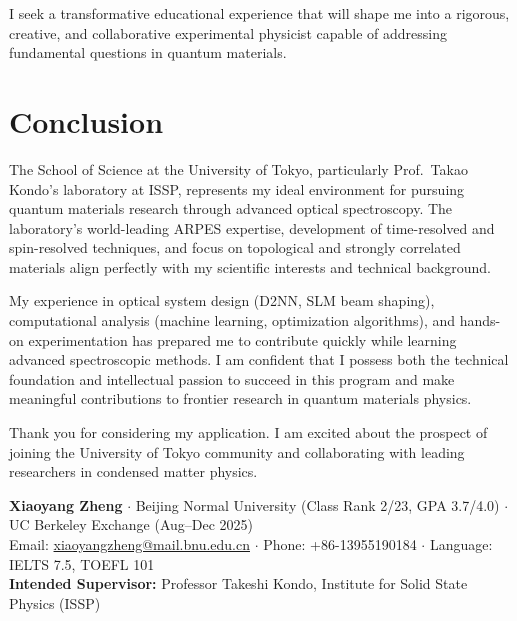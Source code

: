\documentclass[11pt,a4paper]{article}
\begin{document}
I seek a transformative educational experience that will shape me into a rigorous, creative, and collaborative experimental physicist capable of addressing fundamental questions in quantum materials.

\section{Conclusion}

The School of Science at the University of Tokyo, particularly Prof.~Takao Kondo's laboratory at ISSP, represents my ideal environment for pursuing quantum materials research through advanced optical spectroscopy. The laboratory's world-leading ARPES expertise, development of time-resolved and spin-resolved techniques, and focus on topological and strongly correlated materials align perfectly with my scientific interests and technical background.

My experience in optical system design (D2NN, SLM beam shaping), computational analysis (machine learning, optimization algorithms), and hands-on experimentation has prepared me to contribute quickly while learning advanced spectroscopic methods. I am confident that I possess both the technical foundation and intellectual passion to succeed in this program and make meaningful contributions to frontier research in quantum materials physics.

Thank you for considering my application. I am excited about the prospect of joining the University of Tokyo community and collaborating with leading researchers in condensed matter physics.

\vspace{0.5em}

\noindent
\textbf{Xiaoyang Zheng} $\cdot$ Beijing Normal University (Class Rank 2/23, GPA 3.7/4.0) $\cdot$ UC Berkeley Exchange (Aug--Dec 2025)\\
Email: \href{mailto:xiaoyangzheng@mail.bnu.edu.cn}{xiaoyangzheng@mail.bnu.edu.cn} $\cdot$ Phone: +86-13955190184 $\cdot$ Language: IELTS 7.5, TOEFL 101\\
\textbf{Intended Supervisor:} Professor Takeshi Kondo, Institute for Solid State Physics (ISSP)
\end{document}
